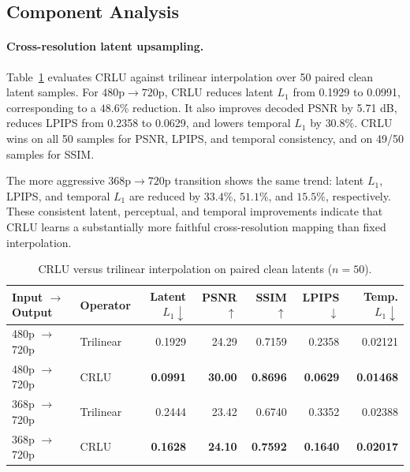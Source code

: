 \subsection{Component Analysis}

\paragraph{Cross-resolution latent upsampling.}
Table~\ref{tab:operator} evaluates CRLU against trilinear interpolation
over 50 paired clean latent samples. For
\(480\text{p}\rightarrow720\text{p}\), CRLU reduces latent \(L_1\) from
0.1929 to 0.0991, corresponding to a \(48.6\%\) reduction. It also
improves decoded PSNR by 5.71 dB, reduces LPIPS from 0.2358 to 0.0629,
and lowers temporal \(L_1\) by \(30.8\%\). CRLU wins on all 50 samples
for PSNR, LPIPS, and temporal consistency, and on 49/50 samples for
SSIM.

The more aggressive \(368\text{p}\rightarrow720\text{p}\) transition
shows the same trend: latent \(L_1\), LPIPS, and temporal \(L_1\) are
reduced by \(33.4\%\), \(51.1\%\), and \(15.5\%\), respectively.
These consistent latent, perceptual, and temporal improvements indicate
that CRLU learns a substantially more faithful cross-resolution mapping
than fixed interpolation.

\begin{table}[!t]
\centering
\footnotesize
\setlength{\tabcolsep}{5pt}
\begin{tabular}{llrrrrr}
\toprule
Input $\rightarrow$ Output & Operator & Latent $L_1\downarrow$ &
PSNR $\uparrow$ & SSIM $\uparrow$ & LPIPS $\downarrow$ &
Temp. $L_1\downarrow$ \\
\midrule
480p $\rightarrow$ 720p & Trilinear & 0.1929 & 24.29 & 0.7159 &
0.2358 & 0.02121 \\
480p $\rightarrow$ 720p & CRLU & \textbf{0.0991} & \textbf{30.00} &
\textbf{0.8696} & \textbf{0.0629} & \textbf{0.01468} \\
368p $\rightarrow$ 720p & Trilinear & 0.2444 & 23.42 & 0.6740 &
0.3352 & 0.02388 \\
368p $\rightarrow$ 720p & CRLU & \textbf{0.1628} & \textbf{24.10} &
\textbf{0.7592} & \textbf{0.1640} & \textbf{0.02017} \\
\bottomrule
\end{tabular}
\caption{CRLU versus trilinear interpolation on paired clean latents
(\(n=50\)).}
\label{tab:operator}
\end{table}

